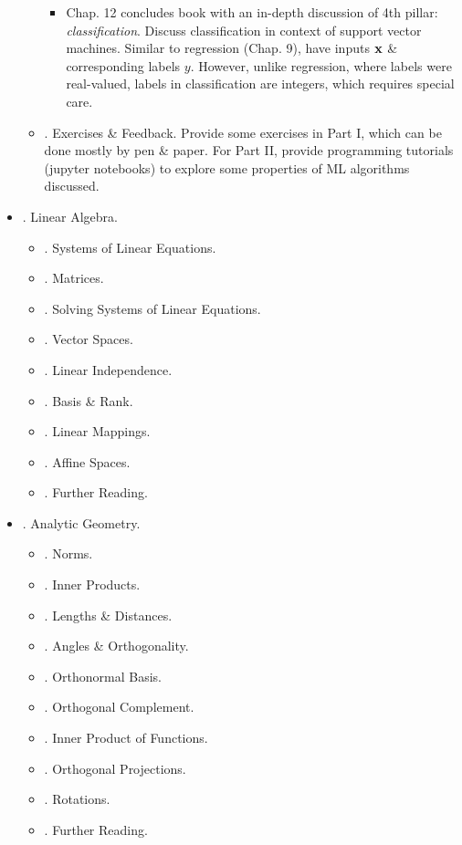 \documentclass{article}
\begin{document}
\begin{itemize}
\begin{itemize}
\begin{itemize}
			\item Chap. 12 concludes book with an in-depth discussion of 4th pillar: {\it classification}. Discuss classification in context of support vector machines. Similar to regression (Chap. 9), have inputs ${\bf x}$ \& corresponding labels $y$. However, unlike regression, where labels were real-valued, labels in classification are integers, which requires special care.
		\end{itemize}
		\item {. Exercises \& Feedback.} Provide some exercises in Part I, which can be done mostly by pen \& paper. For Part II, provide programming tutorials (jupyter notebooks) to explore some properties of ML algorithms discussed.
	\end{itemize}
	\item {. Linear Algebra.}
	\begin{itemize}
		\item {. Systems of Linear Equations.}
		\item {. Matrices.}
		\item {. Solving Systems of Linear Equations.}
		\item {. Vector Spaces.}
		\item {. Linear Independence.}
		\item {. Basis \& Rank.}
		\item {. Linear Mappings.}
		\item {. Affine Spaces.}
		\item {. Further Reading.}
	\end{itemize}
	\item {. Analytic Geometry.}
	\begin{itemize}
		\item {. Norms.}
		\item {. Inner Products.}
		\item {. Lengths \& Distances.}
		\item {. Angles \& Orthogonality.}
		\item {. Orthonormal Basis.}
		\item {. Orthogonal Complement.}
		\item {. Inner Product of Functions.}
		\item {. Orthogonal Projections.}
		\item {. Rotations.}
		\item {. Further Reading.}
	\end{itemize}

\end{itemize}
\end{document}
